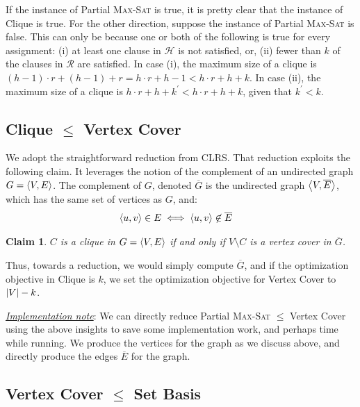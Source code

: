 \documentclass[11pt,onecolumn]{article}
\newcommand{\tuple}[1]{\ensuremath{\left\langle #1 \right\rangle}\xspace}
\newcommand{\size}[1]{\ensuremath{\left|#1\right|}\xspace}
\let\originalleft\left
\let\originalright\right
\renewcommand{\left}{\mathopen{}\mathclose\bgroup\originalleft}
\renewcommand{\right}{\aftergroup\egroup\originalright}
\newtheorem{claim}{Claim}
\begin{document}
\vspace*{0.125in}
\noindent
If the instance of Partial \textsc{Max-Sat} is true, it is pretty clear that the instance of Clique is true. For the other direction, suppose the instance of Partial \textsc{Max-Sat} is false. This can only be because one or both of the following is true for every assignment: (i) at least one clause in $\mathcal{H}$ is not satisfied, or, (ii) fewer than $k$ of the clauses in $\mathcal{R}$ are satisfied. In case (i), the maximum size of a clique is $(h-1)\cdot r + (h-1) + r = h\cdot r + h - 1 < h\cdot r + h + k$. In case (ii), the maximum size of a clique is $h\cdot r + h + k^\prime < h\cdot r + h + k$, given that $k^\prime < k$.

\subsection*{Clique $\le$ Vertex Cover}

\vspace*{0.125in}
\noindent
We adopt the straightforward reduction from CLRS. That reduction exploits the following claim. It leverages the notion of the complement of an undirected graph $G = \tuple{V, E}$. The complement of $G$, denoted $\overline{G}$ is the undirected graph $\tuple{V, \overline{E}}$, which has the same set of vertices as $G$, and:
\begin{align*}
	\tuple{u,v} \in E &\iff \tuple{u,v} \not\in \overline{E}
\end{align*}

\begin{claim}
$C$ is a clique in $G = \tuple{V,E}$ if and only if $V\setminus C$ is a vertex cover in $\overline{G}$.
\end{claim}

\vspace*{0.125in}
\noindent
Thus, towards a reduction, we would simply compute $\overline{G}$, and if the optimization objective in Clique is $k$, we set the optimization objective for Vertex Cover to $\size{V} - k$.

\vspace*{0.125in}
\noindent
\underline{\emph{Implementation note}}: We can directly reduce Partial \textsc{Max-Sat} $\le$ Vertex Cover using the above insights to save some implementation work, and perhaps time while running. We produce the vertices for the graph as we discuss above, and directly produce the edges $\overline{E}$ for the graph.

\subsection*{Vertex Cover $\le$ Set Basis}
\end{document}
